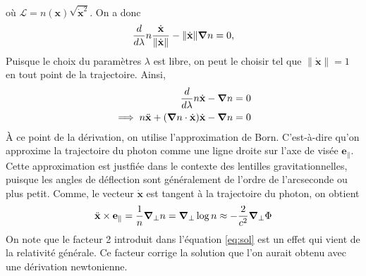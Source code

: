 où $\mathcal{L} = n(\mathbf{x})  \sqrt{\dot{\mathbf{x}}^{2}}$. On a donc
\begin{equation}\label{eq:EulerLagrange2}
        \frac{d }{d \lambda} n \frac{\dot{\mathbf{x}}}{\lVert \dot{\mathbf{x}} \rVert}- \lVert \dot{\mathbf{x}} \rVert \grad n = 0 ,
\end{equation} 
Puisque le choix du paramètres $\lambda$ est libre, on peut le choisir tel 
que $\lVert \dot{\mathbf{x}} \rVert = 1$ en tout point de la trajectoire. Ainsi,
\begin{equation}\label{eq:EulerLagrange3}
\begin{aligned}
        \frac{d }{d \lambda} n \dot{\mathbf{x}} -  \grad n &= 0 \\
        \implies n \ddot{\mathbf{x}} + (\grad n \cdot \dot{\mathbf{x}}) \dot{\mathbf{x}} - \grad n &= 0
\end{aligned}
\end{equation} 
À ce point de la dérivation, on utilise l'approximation de Born. 
C'est-à-dire qu'on approxime la trajectoire 
du photon comme une ligne droite sur l'axe de visée $\mathbf{e}_{\parallel}$. 
Cette approximation est justfiée 
dans le contexte des lentilles gravitationnelles, 
puisque les angles de déflection sont généralement de 
l'ordre de l'arcseconde ou plus petit. 
Comme, le vecteur $\dot{\mathbf{x}}$ est tangent à la trajectoire du photon, 
on obtient
\begin{equation}\label{eq:sol}
        \ddot{\mathbf{x}} \times \mathbf{e}_{\parallel} = \frac{1}{n} \grad_\perp n = \grad_\perp \log n
        \approx -\frac{2}{c^{2}}\grad_{\perp} \Phi
\end{equation} 
On note que le facteur 2 introduit dans l'équation \eqref{eq:sol} est un 
effet qui vient de la relativité générale. Ce facteur corrige la solution 
que l'on aurait obtenu avec une dérivation newtonienne.

